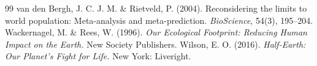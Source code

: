 \documentclass[preprint,12pt,authoryear]{elsarticle}
\begin{document}
\begin{thebibliography}{99}
 van den Bergh, J. C. J. M. \& Rietveld, P. (2004). Reconsidering the limits to world population: Meta-analysis and meta-prediction. \emph{BioScience}, 54(3), 195--204.
 Wackernagel, M. \& Rees, W. (1996). \emph{Our Ecological Footprint: Reducing Human Impact on the Earth.} New Society Publishers.
 Wilson, E. O. (2016). \emph{Half-Earth: Our Planet's Fight for Life.} New York: Liveright.
\end{thebibliography}
\end{document}
